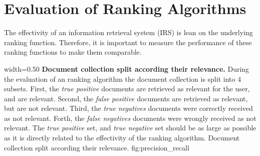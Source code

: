 




\section{Evaluation of Ranking Algorithms}
\label{sec:evaluation_of_ranking_algorithms}

The effectivity of an information retrieval system (IRS) is lean on the underlying ranking function. Therefore, it is important to measure the performance of these ranking functions to make them comparable.

      {width=0.50\textwidth}
      {\textbf{Document collection split according their relevance.} During the evaluation of an ranking algorithm the document collection is split into $4$ subsets. First, the \textit{true positive} documents are retrieved as relevant for the user, and are relevant. Second, the \textit{false positive} documents are retrieved as relevant, but are not relevant. Third, the \textit{true negatives} documents were correctly received as not relevant. Forth, the \textit{false negatives} documents were wrongly received as not relevant. The \textit{true positive} set, and \textit{true negative} set should be as large as possible as it is directly related to the effectivity of the ranking algorithm.}
      {Document collection split according their relevance.}
      {fig:precision_recall}

